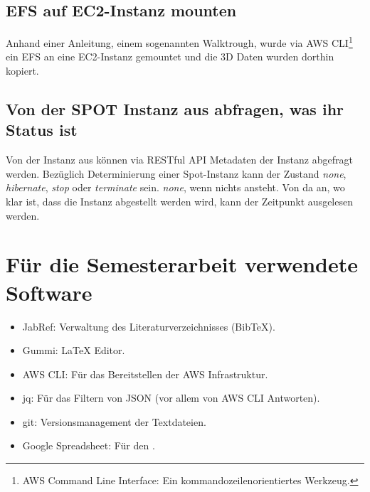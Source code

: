 \subsection{EFS auf EC2-Instanz mounten}
Anhand einer Anleitung, einem sogenannten Walktrough, wurde via AWS CLI\footnote{AWS Command Line Interface: Ein kommandozeilenorientiertes Werkzeug.} ein
EFS an eine EC2-Instanz gemountet und die 3D Daten wurden dorthin kopiert.


\subsection{Von der SPOT Instanz aus abfragen, was ihr Status ist}\label{appendix:restful}
Von der Instanz aus können via RESTful API Metadaten der Instanz abgefragt werden. Bezüglich Determinierung einer Spot-Instanz kann der Zustand \emph{none}, \emph{hibernate}, \emph{stop} oder \emph{terminate} sein. \emph{none}, wenn nichts ansteht. Von da an, wo klar ist, dass die Instanz abgestellt werden wird, kann der Zeitpunkt ausgelesen werden.

\section{Für die Semesterarbeit verwendete Software}
\begin{itemize}
\item JabRef: Verwaltung des Literaturverzeichnisses (BibTeX).
\item Gummi: LaTeX Editor.
\item AWS CLI: Für das Bereitstellen der AWS Infrastruktur.
\item jq: Für das Filtern von JSON (vor allem von AWS CLI Antworten).
\item git: Versionsmanagement der Textdateien.
\item Google Spreadsheet: Für den .
\end{itemize}
